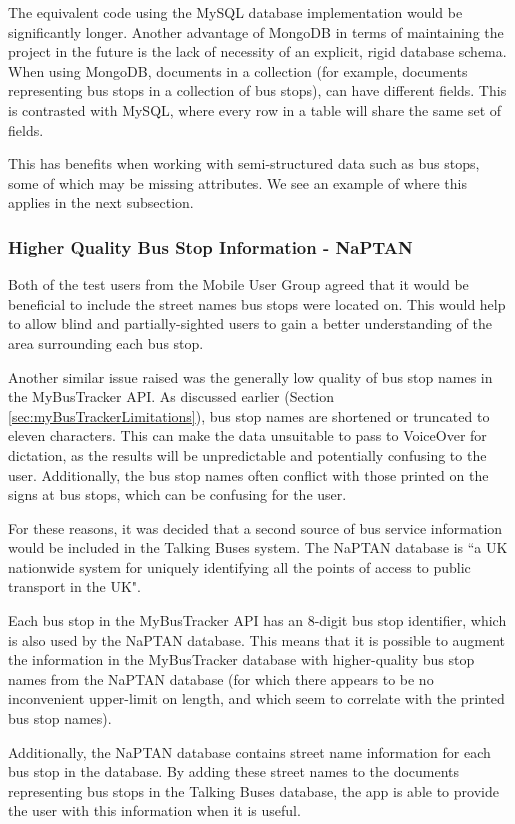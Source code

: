 \documentclass[10pt,twocolumn]{article}
\begin{document}
The equivalent code using the MySQL database implementation would be significantly longer. Another advantage of MongoDB in terms of maintaining the project in the future is the lack of necessity of an explicit, rigid database schema. When using MongoDB, documents in a collection (for example, documents representing bus stops in a collection of bus stops), can have different fields. This is contrasted with MySQL, where every row in a table will share the same set of fields.

This has benefits when working with semi-structured data such as bus stops, some of which may be missing attributes. We see an example of where this applies in the next subsection.

\subsubsection{Higher Quality Bus Stop Information - NaPTAN}
\label{sec:naptanImp}
Both of the test users from the Mobile User Group agreed that it would be beneficial to include the street names bus stops were located on. This would help to allow blind and partially-sighted users to gain a better understanding of the area surrounding each bus stop.

Another similar issue raised was the generally low quality of bus stop names in the MyBusTracker API. As discussed earlier (Section \ref{sec:myBusTrackerLimitations}), bus stop names are shortened or truncated to eleven characters. This can make the data unsuitable to pass to VoiceOver for dictation, as the results will be unpredictable and potentially confusing to the user. Additionally, the bus stop names often conflict with those printed on the signs at bus stops, which can be confusing for the user.

For these reasons, it was decided that a second source of bus service information would be included in the Talking Buses system.  The NaPTAN database is ``a UK nationwide system for uniquely identifying all the points of access to public transport in the UK".

Each bus stop in the MyBusTracker API has an 8-digit bus stop identifier, which is also used by the NaPTAN database. This means that it is possible to augment the information in the MyBusTracker database with higher-quality bus stop names from the NaPTAN database (for which there appears to be no inconvenient upper-limit on length, and which seem to correlate with the printed bus stop names).

Additionally, the NaPTAN database contains street name information for each bus stop in the database. By adding these street names to the documents representing bus stops in the Talking Buses database, the app is able to provide the user with this information when it is useful.
\end{document}
